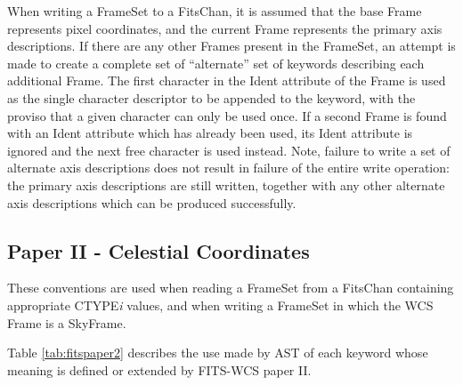 \documentclass[twoside,11pt]{article}
\begin{document}
When writing a FrameSet to a FitsChan, it is assumed that the base Frame
represents pixel coordinates, and the current Frame represents the
primary axis descriptions. If there are any other Frames present in the
FrameSet, an attempt is made to create a complete set of ``alternate''
set of keywords describing each additional Frame. The first character in
the Ident attribute of the Frame is used as the single character
descriptor to be appended to the keyword, with the proviso that a given
character can only be used once. If a second Frame is found with an Ident
attribute which has already been used, its Ident attribute is ignored and
the next free character is used instead. Note, failure to write a set of
alternate axis descriptions does not result in failure of the entire
write operation: the primary axis descriptions are still written,
together with any other alternate axis descriptions which can be produced
successfully.

\subsection{Paper II - Celestial Coordinates}
These conventions are used when reading a FrameSet
from a FitsChan containing appropriate CTYPE\emph{i} 
values, and when writing a FrameSet in which the WCS Frame
is a SkyFrame.

Table \ref{tab:fitspaper2} describes the use made by AST of each keyword
whose meaning is defined or extended by FITS-WCS paper II. 
\end{document}
